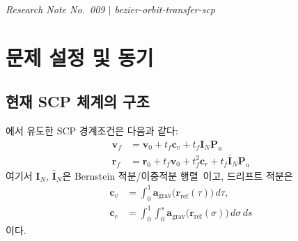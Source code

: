 \documentclass[11pt]{article}
\begin{document}
\drawborder
\thispagestyle{firstpage}


{\normalsize\textit{Research Note No.~009 $|$ bezier-orbit-transfer-scp}}\par\medskip

\def\lighterdate{March 16, 2026}


\begin{abstract}
\cite{report006}의 SCP 정식화에서 중력 드리프트 적분 $\mathbf{c}_v$, $\mathbf{c}_r$은
참조 궤도를 수치 적분(RK4)하여 계산하며, 이것이 계산 시간의 86\%를 차지한다~\cite{report008}.
본 노트에서는 비선형 중력장 $\mathbf{a}_\text{grav}(\mathbf{r})$와
베지어 위치 궤적 $\mathbf{r}(\tau)$의 합성(composition)을
구간별 1차(또는 2차) 테일러 전개로 근사하여,
드리프트 적분을 제어점에 대한 아핀 연산으로 대체하는 방법을 유도한다.
드 카스텔조 세분화(de~Casteljau subdivision)를 통한
구간 분할이 자연스러운 trust-region 역할을 하며,
RK4 전파를 완전히 제거하여 SCP 반복당 계산 비용을
QP/SOCP 풀이 수준으로 줄일 수 있음을 보인다.
\end{abstract}

\section{문제 설정 및 동기}
\label{sec:motivation}

\subsection{현재 SCP 체계의 구조}

\cite{report006}에서 유도한 SCP 경계조건은 다음과 같다:
\begin{align}
  \mathbf{v}_f &= \mathbf{v}_0 + t_f \mathbf{c}_v + t_f \mathbf{I}_N \mathbf{P}_u
  \label{eq:bc-vel} \\
  \mathbf{r}_f &= \mathbf{r}_0 + t_f \mathbf{v}_0 + t_f^2 \mathbf{c}_r + t_f \bar{\mathbf{I}}_N \mathbf{P}_u
  \label{eq:bc-pos}
\end{align}
여기서 $\mathbf{I}_N$, $\bar{\mathbf{I}}_N$은 Bernstein 적분/이중적분 행렬~\cite{report004}이고,
드리프트 적분은
\begin{align}
  \mathbf{c}_v &= \int_0^1 \mathbf{a}_\text{grav}\bigl(\mathbf{r}_\text{ref}(\tau)\bigr)\,d\tau,
  \label{eq:cv-def} \\
  \mathbf{c}_r &= \int_0^1 \!\int_0^s \mathbf{a}_\text{grav}\bigl(\mathbf{r}_\text{ref}(\sigma)\bigr)\,d\sigma\,ds
  \label{eq:cr-def}
\end{align}
이다.
\end{document}
